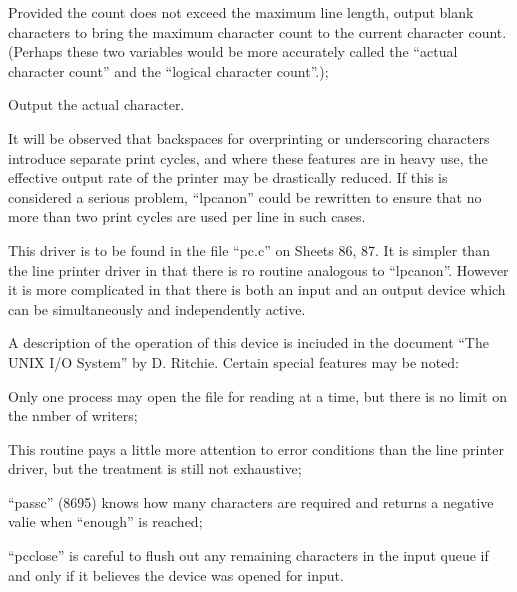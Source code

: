 \item[8954:] Provided the
count does not exceed the maximum
line length, output blank characters to
bring the maximum character count to the
current character count. (Perhaps these two
variables would be more accurately called the
``actual character count'' and the ``logical character count''.);

\item[8959:] Output the actual character.
\ed


It will be observed that backspaces for
overprinting or underscoring characters
introduce separate print cycles, and
where these features are in heavy use,
the effective output rate of the
printer may be drastically reduced. If
this is considered a serious problem,
``lpcanon'' could be rewritten to ensure
that no more than two print cycles are
used per line in such cases.


This driver is to be found in the file
``pc.c'' on Sheets 86, 87. It is simpler
than the line printer driver in that
there is ro routine analogous to
``lpcanon''. However it is more complicated in that there is both an input
and an output device which can be
simultaneously and independently
active.

A description of the operation of this
device is inciuded in the document ``The
UNIX I/O System'' by D. Ritchie. Certain
special features may be noted:

\bd
\item[(1)] Only one process may open the file
for reading at a time, but there is no
limit on the nmber of writers;

\item[(2)] This routine pays a little more
attention to error conditions than the
line printer driver, but the treatment
is still not exhaustive;

\item[(3)] ``passc'' (8695) knows how many
characters are required and returns a
negative valie when ``enough'' is
reached;

\item[(4)] ``pcclose'' is careful to flush out
any remaining characters in the input
queue if and only if it believes the
device was opened for input.
\ed
